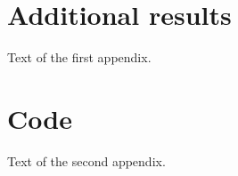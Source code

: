 \section{Additional results}
Text of the first appendix.

\section{Code}
Text of the second appendix.
